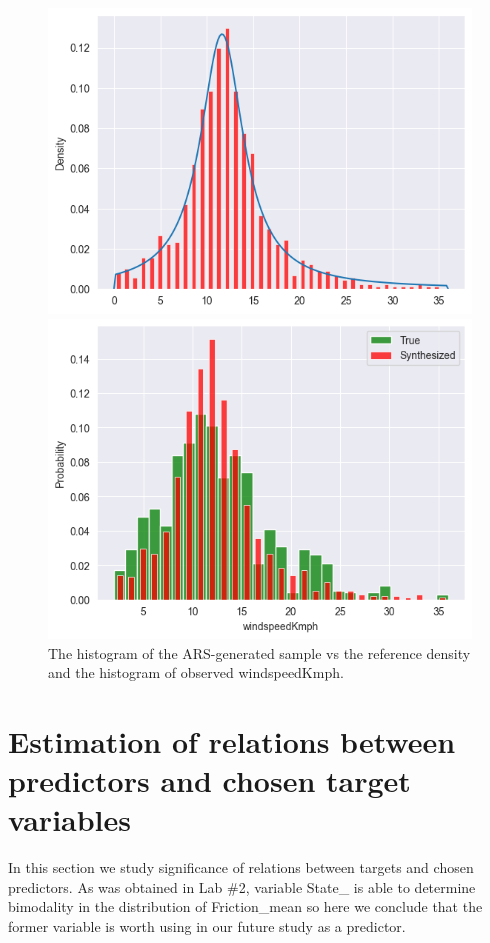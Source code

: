 \documentclass[12pt, bachelor, substylefile = algo_title.rtx]{disser}
\theoremstyle{definition}
\begin{document}
\begin{figure}[!h] 
   \begin{minipage}{.48\textwidth}
     \includegraphics[width=\linewidth]{arsws1}
   \end{minipage} \hfill
\begin{minipage}{.48\textwidth}
     \includegraphics[width=\linewidth]{arsws}
   \end{minipage}
\caption{The histogram of the ARS-generated sample vs the reference density and the histogram of observed windspeedKmph.} 
\label{fig: 10}
\end{figure}



\section{Estimation of relations between predictors and chosen target variables}
In this section we study significance of relations between targets and chosen predictors. As was obtained in Lab \#2, variable State\_ is able to determine bimodality in the distribution of Friction\_mean so here we conclude that the former variable is worth using in our future study as a predictor.
\end{document}

